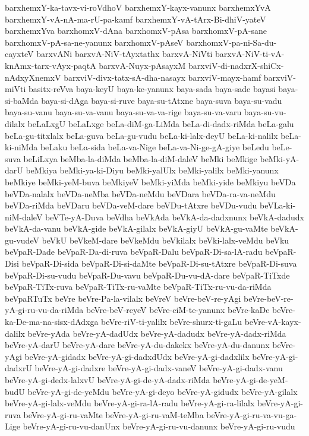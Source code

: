 {barxhemxY-ka-tavx-vi-roVdhoV
barxhemxY-kayx-vanunx
barxhemxYvA
barxhemxY-vA-nA-ma-rU-pa-kamf
barxhemxY-vA-tArx-Bi-dhiV-yateV
barxhemxYva
barxhomxV-dAna
barxhomxV-pAsa
barxhomxV-pA-sane
barxhomxV-pA-sa-ne-yanunx
barxhomxV-pAseV
barxhomxV-pa-ni-Sa-du-cayxteV
barxvANi
barxvA-NiV-tAyxtathx
barxvA-NiVti
barxvA-NiV-ti-vA-knAmx-tarx-vAyx-paqtA
barxvA-Nuyx-pAsayxM
barxviV-di-nadxrX-shiCx-nAdxyXnemxV
barxviV-divx-tatx-sA-dha-nasayx
barxviV-mayx-hamf
barxviV-miVti
basitx-reVva
baya-keyU
baya-ke-yanunx
baya-sada
baya-sade
bayasi
baya-si-baMda
baya-si-dAga
baya-si-ruve
baya-su-tAtxne
baya-suva
baya-su-vadu
baya-su-vanu
baya-su-va-vanu
baya-su-va-va-rige
baya-su-va-varu
baya-su-vu-dilalx
beLaLxgU
beLaLxge
beLa-diM-ga-LiMda
beLa-di-dadx-riMda
beLa-galu
beLa-gu-titxlalx
beLa-guva
beLa-gu-vudu
beLa-ki-lalx-deyU
beLa-ki-nalilx
beLa-ki-niMda
beLaku
beLa-sida
beLa-va-Nige
beLa-va-Ni-ge-gA-giye
beLedu
beLe-suva
beLiLxya
beMba-la-diMda
beMba-la-diM-daleV
beMki
beMkige
beMki-yA-darU
beMkiya
beMki-ya-ki-Diyu
beMki-yalUlx
beMki-yalilx
beMki-yanunx
beMkiye
beMki-yeM-buva
beMkiyeV
beMki-yiMda
beMki-yide
beMkiyu
beVDa
beVDa-nalalx
beVDa-neMba
beVDa-neMdu
beVDara
beVDa-ra-va-neMdu
beVDa-riMda
beVDaru
beVDa-veM-dare
beVDu-tAtxre
beVDu-vudu
beVLa-ki-niM-daleV
beVTe-yA-Duva
beVdha
beVkAda
beVkA-da-dadxnunx
beVkA-dadudx
beVkA-da-vanu
beVkA-gide
beVkA-gilalx
beVkA-giyU
beVkA-gu-vaMte
beVkA-gu-vudeV
beVkU
beVkeM-dare
beVkeMdu
beVkilalx
beVki-lalx-veMdu
beVku
beVpaR-Dade
beVpaR-Da-di-ruva
beVpaR-Dalu
beVpaR-Di-sa-lA-radu
beVpaR-Disi
beVpaR-Di-sida
beVpaR-Di-si-daMte
beVpaR-Di-su-tAtxre
beVpaR-Di-suva
beVpaR-Di-su-vudu
beVpaR-Du-vavu
beVpaR-Du-vu-dA-dare
beVpaR-TiTxde
beVpaR-TiTx-ruva
beVpaR-TiTx-ru-vaMte
beVpaR-TiTx-ru-vu-da-riMda
beVpaRTuTx
beVre
beVre-Pa-la-vilalx
beVreV
beVre-beV-re-yAgi
beVre-beV-re-yA-gi-ru-vu-da-riMda
beVre-beV-reyeV
beVre-ciM-te-yanunx
beVre-kaDe
beVre-ka-De-ma-na-sisx-dAdxga
beVre-riV-ti-yalilx
beVre-shurx-ti-gaLu
beVre-vA-kayx-dalilx
beVre-yAda
beVre-yA-dadUdx
beVre-yA-dadudx
beVre-yA-dadx-riMda
beVre-yA-darU
beVre-yA-dare
beVre-yA-du-dakekx
beVre-yA-du-danunx
beVre-yAgi
beVre-yA-gidadx
beVre-yA-gi-dadxdUdx
beVre-yA-gi-dadxlilx
beVre-yA-gi-dadxrU
beVre-yA-gi-dadxre
beVre-yA-gi-dadx-vaneV
beVre-yA-gi-dadx-vanu
beVre-yA-gi-dedx-lalxvU
beVre-yA-gi-de-yA-dadx-riMda
beVre-yA-gi-de-yeM-budU
beVre-yA-gi-de-yeMdu
beVre-yA-gi-deyo
beVre-yA-gidudx
beVre-yA-gilalx
beVre-yA-gi-lalx-veMdu
beVre-yA-gi-ra-lA-radu
beVre-yA-gi-ra-lilalx
beVre-yA-gi-ruva
beVre-yA-gi-ru-vaMte
beVre-yA-gi-ru-vaM-teMba
beVre-yA-gi-ru-va-vu-ga-Lige
beVre-yA-gi-ru-vu-danUnx
beVre-yA-gi-ru-vu-danunx
beVre-yA-gi-ru-vudu
}
